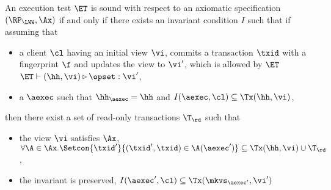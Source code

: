 \begin{definition}
\label{def:et_sound}
An execution test $\ET$ is sound with respect to an axiomatic 
specification $(\RP_{\LWW}, \Ax)$ if and only if
there exists an invariant condition $I$ such that 
if assuming that
\begin{itemize}
    \item a client \( \cl \) having an initial view \( \vi \), 
        commits a transaction \( \txid \) with a fingerprint \( \f \) and updates the view to \( \vi' \), 
        which is allowed by \( \ET \) \ie $\ET \vdash (\hh, \vi) \triangleright \opset: \vi'$,
    \item a $\aexec$ such that $\hh_{\aexec} = \hh$ and $I(\aexec, \cl) \subseteq \Tx(\hh, \vi)$,
\end{itemize}
then there exist a set of read-only transactions $\T_{\rd}$ such that 
\begin{itemize}
\item the view \( \vi \) satisfies \( \Ax \), \ie $\forall \A \in \Ax. \Setcon{\txid' }{ (\txid', \txid) \in \A(\aexec')} \subseteq \Tx(\hh, \vi) \cup \T_{\rd}$, 
\item the invariant is preserved, \ie $I(\aexec', \cl) \subseteq \Tx(\mkvs_{\aexec'}, \vi')$
\end{itemize}
\end{definition}

